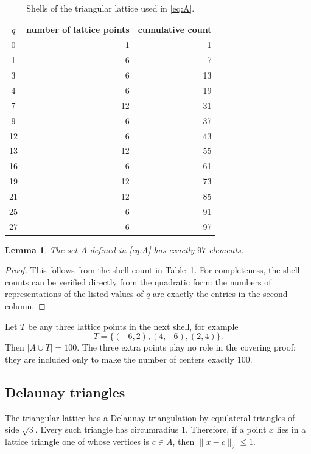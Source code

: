 \documentclass[11pt]{article}
\newtheorem{lemma}[theorem]{Lemma}
\theoremstyle{definition}
\begin{document}
\begin{table}[ht]
\centering
\caption{Shells of the triangular lattice used in \eqref{eq:A}.}
\label{tab:shells}
\begin{tabular}{@{}c r r@{}}
\toprule
$q$ & number of lattice points & cumulative count\\
\midrule
0&1&1\\
1&6&7\\
3&6&13\\
4&6&19\\
7&12&31\\
9&6&37\\
12&6&43\\
13&12&55\\
16&6&61\\
19&12&73\\
21&12&85\\
25&6&91\\
27&6&97\\
\bottomrule
\end{tabular}
\end{table}

\begin{lemma}
\label{lem:countA}
The set $A$ defined in \eqref{eq:A} has exactly $97$ elements.
\end{lemma}

\begin{proof}
This follows from the shell count in Table~\ref{tab:shells}.  For
completeness, the shell counts can be verified directly from the
quadratic form: the numbers of representations of the listed values of
$q$ are exactly the entries in the second column.
\end{proof}

Let $T$ be any three lattice points in the next shell, for example
\begin{equation}
  T=\{(-6,2),(4,-6),(2,4)\}.
  \label{eq:T}
\end{equation}
Then $|A\cup T|=100$.  The three extra points play no role in the
covering proof; they are included only to make the number of centers
exactly $100$.

\subsection{Delaunay triangles}

The triangular lattice has a Delaunay triangulation by equilateral
triangles of side $\sqrt3$.  Every such triangle has circumradius $1$.
Therefore, if a point $x$ lies in a lattice triangle one of whose
vertices is $c\in A$, then $\|x-c\|_2\le1$.
\end{document}
